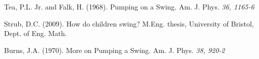 \documentclass[10pt,letter, swedish, english,%
]{article}
\begin{document}
\begin{thebibliography}{9}

Tea, P.L. Jr. and Falk, H. (1968). Pumping on a Swing. Am. J. Phys. 
\textit{36, 1165-6}

Strub, D.C. (2009). How do children swing?  M.Eng. thesis, University
of Bristol, Dept. of Eng. Math.%

Burns, J.A. (1970). More on Pumping a Swing. Am. J. Phys. \textit{38, 920-2}
\end{thebibliography}
\end{document}
